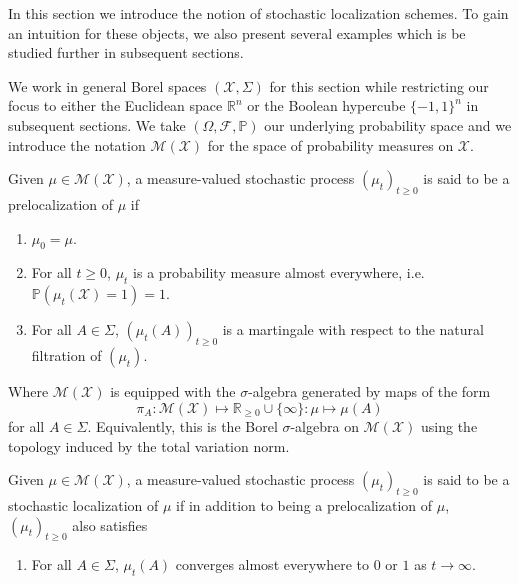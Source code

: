 In this section we introduce the notion of stochastic localization schemes. 
To gain an intuition for these objects, we also present several examples which 
is be studied further in subsequent sections. 

We work in general Borel spaces \((\mathcal{X}, \Sigma)\) for this section while restricting our 
focus to either the Euclidean space \(\mathbb{R}^n\) or the Boolean hypercube \(\{-1, 1\}^n\) 
in subsequent sections. We take \((\Omega, \mathscr{F}, \mathbb{P})\) our underlying probability space 
and we introduce the notation \(\mathcal{M}(\mathcal{X})\) for the space of probability measures on 
\(\mathcal{X}\).

\begin{definition}
  Given \(\mu \in \mathcal{M}(\mathcal{X})\), a measure-valued stochastic process 
  \((\mu_t)_{t \ge 0}\) is said to be a prelocalization of \(\mu\) if 
  \begin{enumerate}[label=(L\arabic*), start=0]
    \item \label{L0} \(\mu_0 = \mu\).
    \item \label{L1} For all \(t \ge 0\), \(\mu_t\) is a probability measure almost everywhere, i.e. 
      \(\mathbb{P}(\mu_t(\mathcal{X}) = 1) = 1\).
    \item \label{L2} For all \(A \in \Sigma\), \((\mu_t(A))_{t \ge 0}\) is a martingale with respect 
      to the natural filtration of \((\mu_t)\).
  \end{enumerate}
  Where \(\mathcal{M}(\mathcal{X})\) is equipped with the \(\sigma\)-algebra generated by maps of the form 
  \[\pi_A : \mathcal{M}(\mathcal{X}) \mapsto \mathbb{R}_{\ge 0} \cup \{\infty\} : \mu \mapsto \mu(A)\] 
  for all \(A \in \Sigma\). Equivalently, this is the Borel \(\sigma\)-algebra on \(\mathcal{M}(\mathcal{X})\) 
  using the topology induced by the total variation norm.
\end{definition}

\begin{definition}
  Given \(\mu \in \mathcal{M}(\mathcal{X})\), a measure-valued stochastic process 
  \((\mu_t)_{t \ge 0}\) is said to be a stochastic localization of \(\mu\) if in addition to being a 
  prelocalization of \(\mu\), \((\mu_t)_{t \ge 0}\) also satisfies
  \begin{enumerate}[label=(L\arabic*), start=3]
    \item \label{L3} For all \(A \in \Sigma\), \(\mu_t(A)\) converges almost everywhere to \(0\) 
      or \(1\) as \(t \to \infty\).
  \end{enumerate}
\end{definition}

